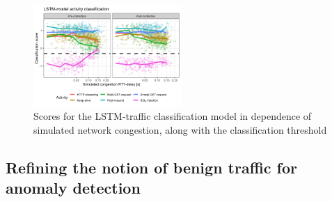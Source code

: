 \documentclass[sigconf]{acmart}
\begin{document}



\begin{figure}
\centering
\includegraphics[width=0.5\textwidth]{images/LSTM_exp.png}
\caption{Scores for the LSTM-traffic classification model in dependence of simulated network congestion, along with the classification threshold}\label{fig:LSTM_exp}
\end{figure}

\subsection{Refining the notion of benign traffic for anomaly detection}
\end{document}
